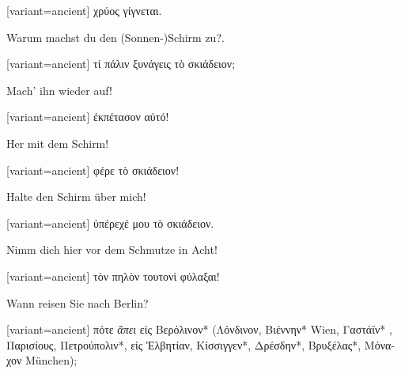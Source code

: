 \begin{greek}[variant=ancient]%
χρύος γίγνεται.

\end{greek}%
\switchcolumn*

Warum machst du den (Sonnen-)Schirm zu?.

\switchcolumn

\begin{greek}[variant=ancient]%
τί πάλιν ξυνάγεις τὸ σκιάδειον;

\end{greek}%
\switchcolumn*

Mach' ihn wieder auf!

\switchcolumn

\begin{greek}[variant=ancient]%
ἐκπέτασον αὐτό!

\end{greek}%
\switchcolumn*

Her mit dem Schirm!

\switchcolumn

\begin{greek}[variant=ancient]%
φέρε τὸ σκιάδειον!

\end{greek}%
\switchcolumn*

Halte den Schirm über mich!

\switchcolumn

\begin{greek}[variant=ancient]%
ὑπέρεχέ μου τὸ σκιάδειον.

\end{greek}%
\switchcolumn*

Nimm dich hier vor dem Schmutze in Acht!

\switchcolumn

\begin{greek}[variant=ancient]%
τὸν πηλὸν τουτονὶ φύλαξαι!

\end{greek}%
\indent Wann reisen Sie nach Berlin?

\switchcolumn

\begin{greek}[variant=ancient]%
πότε \emph{ἄπει} εἰς Βερόλινον{*} (Λόνδινον, Βιέννην{*} \textgerman[spelling=old,babelshorthands=true]{Wien,}
Γαστάϊν{*} , Παρισίους, Πετρούπολιν{*}, εἰς Ἑλβητίαν, Κίσσιγγεν{*},
Δρέσδην{*}, Βρυξέλας{*}, Μόναχον \textgerman[spelling=old,babelshorthands=true]{München});

\end{greek}%
\switchcolumn*

